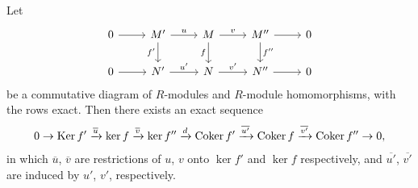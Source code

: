 \begin{proposition}[Snake]
    Let 
\[\begin{tikzcd}
	0 & {M'} & M & {M''} & 0 \\
	0 & {N'} & N & {N''} & 0
	\arrow[from=1-1, to=1-2]
	\arrow["u", from=1-2, to=1-3]
	\arrow["{f'}"', from=1-2, to=2-2]
	\arrow["v", from=1-3, to=1-4]
	\arrow["f"', from=1-3, to=2-3]
	\arrow[from=1-4, to=1-5]
	\arrow["{f''}", from=1-4, to=2-4]
	\arrow[from=2-1, to=2-2]
	\arrow["{u'}", from=2-2, to=2-3]
	\arrow["{v'}", from=2-3, to=2-4]
	\arrow[from=2-4, to=2-5]
\end{tikzcd}\]
    be a commutative diagram of \( R \)-modules and  \( R \)-module homomorphisms, with the rows exact. Then there exists an exact sequence 
     \begin{align*}
         0 \to \operatorname{Ker} f' \xrightarrow{\overline{u}} \ker f \xrightarrow{\overline{v}} \ker f'' \xrightarrow{d} \operatorname{Coker} f' \xrightarrow{\overline{u'}} \operatorname{Coker} f \xrightarrow{\overline{v'}} \operatorname{Coker} f'' \to 0,
    \end{align*}
    in which \( \overline{u} \), \( \overline{v} \) are restrictions of \( u \),  \( v \) onto \( \ker f' \) and  \( \ker f \) respectively, and  \( \overline{u'} \), \( \overline{v'} \) are induced by \( u' \),  \( v' \), respectively. 
\end{proposition}

